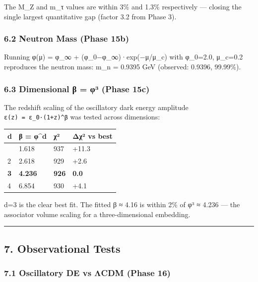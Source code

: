 \documentclass[
]{article}
\begin{document}
The M\_Z and m\_τ values are within 3\% and 1.3\% respectively ---
closing the single largest quantitative gap (factor 3.2 from Phase 3).

\subsubsection{6.2 Neutron Mass (Phase
15b)}\label{neutron-mass-phase-15b}

Running φ(μ) = φ\_∞ + (φ\_0−φ\_∞)·exp(−μ/μ\_c) with φ\_0=2.0, μ\_c=0.2
reproduces the neutron mass: m\_n = 0.9395 GeV (observed: 0.9396,
99.99\%).

\subsubsection{6.3 Dimensional β = φ³ (Phase
15c)}\label{dimensional-ux3b2-ux3c6uxb3-phase-15c}

The redshift scaling of the oscillatory dark energy amplitude
\texttt{ε(z)\ =\ ε\_0·(1+z)\^{}β} was tested across dimensions:

\begin{longtable}[]{@{}llll@{}}
\toprule\noalign{}
d & β = φ\^{}d & χ² & Δχ² vs best \\
\midrule\noalign{}
\endhead
\bottomrule\noalign{}
\endlastfoot
1 & 1.618 & 937 & +11.3 \\
2 & 2.618 & 929 & +2.6 \\
\textbf{3} & \textbf{4.236} & \textbf{926} & \textbf{0.0} \\
4 & 6.854 & 930 & +4.1 \\
\end{longtable}

d=3 is the clear best fit. The fitted β ≈ 4.16 is within 2\% of φ³ ≈
4.236 --- the associator volume scaling for a three-dimensional
embedding.

\begin{center}\rule{0.5\linewidth}{0.5pt}\end{center}

\subsection{7. Observational Tests}\label{observational-tests}

\subsubsection{7.1 Oscillatory DE vs ΛCDM (Phase
16)}\label{oscillatory-de-vs-ux3bbcdm-phase-16}
\end{document}
